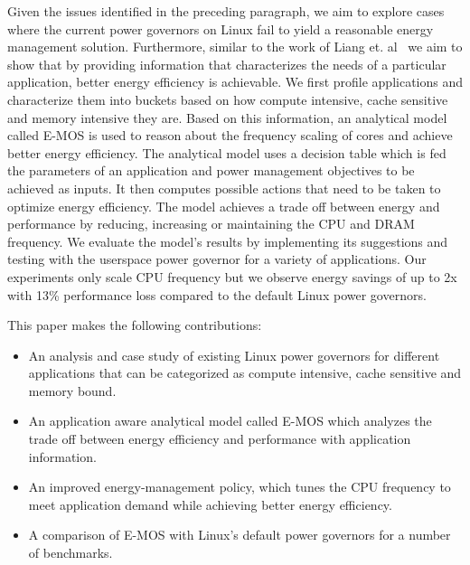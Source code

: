 Given the issues identified in the preceding paragraph, we aim to explore cases where the current power governors on Linux fail to yield a reasonable energy management solution. 
Furthermore, similar to the work of Liang et. al~\cite{and-dvfs} we aim to show that by providing information that characterizes the needs of a particular application, 
better energy efficiency is achievable. We first profile applications and characterize them into buckets based on how compute intensive, cache sensitive and memory intensive they are. 
Based on this information, an analytical model called E-MOS is used to reason about the frequency scaling of cores and achieve better energy efficiency. 
The analytical model uses a decision table which is fed the parameters of an application and power management objectives to be achieved as inputs.
It then computes possible actions that need to be taken to optimize energy efficiency.
The model achieves a trade off between energy and performance by reducing, increasing or maintaining the CPU and DRAM frequency. 
We evaluate the model's results by implementing its suggestions and testing with the userspace power governor for a variety of applications. Our experiments only scale CPU frequency but we 
observe energy savings of up to 2x with 13\% performance loss compared to the default Linux power governors.

This paper makes the following contributions:
\begin{itemize}
\item  An analysis and case study of existing Linux power governors for different applications that can be categorized as compute intensive, cache sensitive and memory bound. 
\item  An application aware analytical model called E-MOS which analyzes the trade off between energy efficiency and performance with application information.
\item  An improved energy-management policy, which tunes the CPU frequency to meet application demand while achieving better energy efficiency.
\item  A comparison of E-MOS with Linux's default power governors for a number of benchmarks.
\end{itemize}


